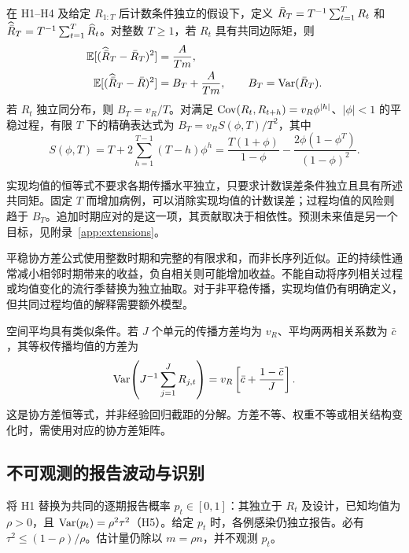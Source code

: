 \begin{corollary}[固定的一组已观测时期]
\label{cor:targets}
在 H1--H4 及给定 $R_{1:T}$ 后计数条件独立的假设下，定义 $\bar R_T=T^{-1}\sum_{t=1}^T R_t$ 和 $\widehat{\bar R}_T=T^{-1}\sum_{t=1}^T\widehat R_t$。对整数 $T\ge1$，若 $R_t$ 具有共同边际矩，则
\begin{equation}
\begin{aligned}
  \mathbb{E}[(\widehat{\bar R}_T-\bar R_T)^2]&=\frac{A}{Tm},\\
  \mathbb{E}[(\widehat{\bar R}_T-\bar R)^2]&=B_T+\frac{A}{Tm},
  \qquad B_T=\mathrm{Var}(\bar R_T).
\end{aligned}
  \label{eq:target-means}
\end{equation}
若 $R_t$ 独立同分布，则 $B_T=v_R/T$。对满足 $\mathrm{Cov}(R_t,R_{t+h})=v_R\phi^{|h|}$、$|\phi|<1$ 的平稳过程，有限 $T$ 下的精确表达式为 $B_T=v_RS(\phi,T)/T^2$，其中
\begin{equation}
  S(\phi,T)=T+2\sum_{h=1}^{T-1}(T-h)\phi^h
  =\frac{T(1+\phi)}{1-\phi}-\frac{2\phi(1-\phi^T)}{(1-\phi)^2}.
  \label{eq:ar-sum}
\end{equation}
\end{corollary}

实现均值的恒等式不要求各期传播水平独立，只要求计数误差条件独立且具有所述共同矩。固定 $T$ 而增加病例，可以消除实现均值的计数误差；过程均值的风险则趋于 $B_T$。追加时期应对的是这一项，其贡献取决于相依性。预测未来值是另一个目标，见附录~\ref{app:extensions}。

平稳协方差公式使用整数时期和完整的有限求和，而非长序列近似。正的持续性通常减小相邻时期带来的收益，负自相关则可能增加收益。不能自动将序列相关过程或均值变化的流行季替换为独立抽取。对于非平稳传播，实现均值仍有明确定义，但共同过程均值的解释需要额外模型。

空间平均具有类似条件。若 $J$ 个单元的传播方差均为 $v_R$、平均两两相关系数为 $\bar c$，其等权传播均值的方差为
\begin{equation}
  \mathrm{Var}\!\left(J^{-1}\sum_{j=1}^J R_{j,t}\right)
  =v_R\left[\bar c+\frac{1-\bar c}{J}\right].
  \label{eq:pooling}
\end{equation}
这是协方差恒等式，并非经验回归截距的分解。方差不等、权重不等或相关结构变化时，需使用对应的协方差矩阵。

\subsection{不可观测的报告波动与识别}
\label{sec:bg-reporting}

将 H1 替换为共同的逐期报告概率 $p_t\in[0,1]$：其独立于 $R_t$ 及设计，已知均值为 $\rho>0$，且 $\mathrm{Var}(p_t)=\rho^2\tau^2$（H5）。给定 $p_t$ 时，各例感染仍独立报告。必有 $\tau^2\le(1-\rho)/\rho$。估计量仍除以 $m=\rho n$，并不观测 $p_t$。

